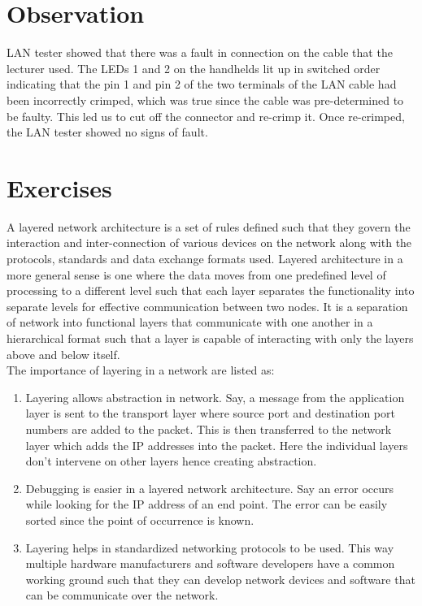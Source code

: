 \documentclass{lab_sheet}
\begin{document}
\section{Observation}
LAN tester showed that there was a fault in connection on the cable that the lecturer used. The LEDs 1 and 2 on the handhelds lit up in switched order indicating that the pin 1 and pin 2 of the two terminals of the LAN cable had been incorrectly crimped, which was true since the cable was pre-determined to be faulty. This led us to cut off the connector and re-crimp it. Once re-crimped, the LAN tester showed no signs of fault.
\section{Exercises}
A layered network architecture is a set of rules defined such that they govern the interaction and inter-connection of various devices on the network along with the protocols, standards and data exchange formats used. Layered architecture in a more general sense is one where the data moves from one predefined level of processing to a different level such that each layer separates the functionality into separate levels for effective communication between two nodes. It is a separation of network into functional layers that communicate with one another in a hierarchical format such that a  layer is capable of interacting with only the layers above and below itself.\\
The importance of layering in a network are listed as:
\begin{enumerate}
    \item Layering allows abstraction in network. Say, a message from the application layer is sent to the transport layer where source port and destination port numbers are added to the packet. This is then transferred to the network layer which adds the IP addresses into the packet. Here the individual layers don't intervene on other layers hence creating abstraction.
    \item Debugging is easier in a layered network architecture. Say an error occurs while looking for the IP address of an end point. The error can be easily sorted since the point of occurrence is known.
    \item Layering helps in standardized networking protocols to be used. This way multiple hardware manufacturers and software developers have a common working ground such that they can develop network devices and software that can be communicate over the network.
\end{enumerate}
\end{document}
